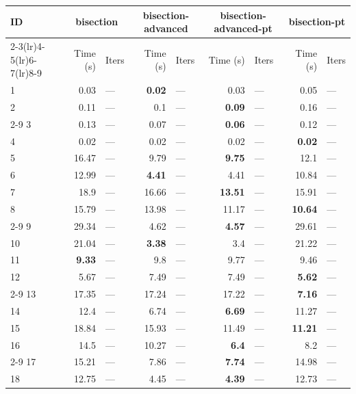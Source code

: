 \begin{longtable}{lr@{\hskip 4pt}l@{\hskip 12pt}r@{\hskip 4pt}l@{\hskip 12pt}r@{\hskip 4pt}l@{\hskip 12pt}r@{\hskip 4pt}l@{\hskip 12pt}}
\toprule
ID & \multicolumn{2}{c}{bisection} & \multicolumn{2}{c}{bisection-advanced} & \multicolumn{2}{c}{bisection-advanced-pt} & \multicolumn{2}{c}{bisection-pt} \\
\cmidrule(lr){2-3}\cmidrule(lr){4-5}\cmidrule(lr){6-7}\cmidrule(lr){8-9}
 & Time (s) &  Iters & Time (s) &  Iters & Time (s) &  Iters & Time (s) &  Iters \\
\midrule
\endhead
1 & 0.03 & --- & \textbf{0.02} & --- & 0.03 & --- & 0.05 & --- \\
2 & 0.11 & --- & 0.1 & --- & \textbf{0.09} & --- & 0.16 & --- \\
\cmidrule{2-9}
3 & 0.13 & --- & 0.07 & --- & \textbf{0.06} & --- & 0.12 & --- \\
4 & 0.02 & --- & 0.02 & --- & 0.02 & --- & \textbf{0.02} & --- \\
\midrule
5 & 16.47 & --- & 9.79 & --- & \textbf{9.75} & --- & 12.1 & --- \\
6 & 12.99 & --- & \textbf{4.41} & --- & 4.41 & --- & 10.84 & --- \\
7 & 18.9 & --- & 16.66 & --- & \textbf{13.51} & --- & 15.91 & --- \\
8 & 15.79 & --- & 13.98 & --- & 11.17 & --- & \textbf{10.64} & --- \\
\cmidrule{2-9}
9 & 29.34 & --- & 4.62 & --- & \textbf{4.57} & --- & 29.61 & --- \\
10 & 21.04 & --- & \textbf{3.38} & --- & 3.4 & --- & 21.22 & --- \\
11 & \textbf{9.33} & --- & 9.8 & --- & 9.77 & --- & 9.46 & --- \\
12 & 5.67 & --- & 7.49 & --- & 7.49 & --- & \textbf{5.62} & --- \\
\cmidrule{2-9}
13 & 17.35 & --- & 17.24 & --- & 17.22 & --- & \textbf{7.16} & --- \\
14 & 12.4 & --- & 6.74 & --- & \textbf{6.69} & --- & 11.27 & --- \\
15 & 18.84 & --- & 15.93 & --- & 11.49 & --- & \textbf{11.21} & --- \\
16 & 14.5 & --- & 10.27 & --- & \textbf{6.4} & --- & 8.2 & --- \\
\cmidrule{2-9}
17 & 15.21 & --- & 7.86 & --- & \textbf{7.74} & --- & 14.98 & --- \\
18 & 12.75 & --- & 4.45 & --- & \textbf{4.39} & --- & 12.73 & --- \\

\end{longtable}
